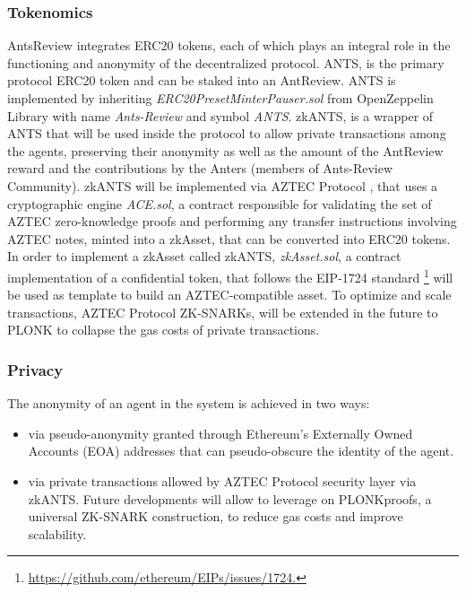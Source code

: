 \documentclass[runningheads]{llncs}
\begin{document}
\subsubsection{Tokenomics}
AntsReview integrates ERC20 tokens, each of which plays an integral role in the functioning and anonymity of the decentralized protocol.
\newline ANTS, is the primary protocol ERC20 token and can be staked into an AntReview.
\newline ANTS is implemented by inheriting \emph{ERC20PresetMinterPauser.sol} from OpenZeppelin Library with name \emph{Ants-Review} and symbol \emph{ANTS}.
\newline zkANTS, is a wrapper of ANTS that will be used inside the protocol to allow private transactions among the agents, preserving their anonymity as well as the amount of the AntReview reward and the contributions by the Anters (members of Ants-Review Community).
\newline zkANTS will be implemented via AZTEC Protocol \cite{AZTEC}, that uses a cryptographic engine \emph{ACE.sol}, a contract responsible for validating the set of AZTEC zero-knowledge proofs and performing any transfer instructions involving AZTEC notes, minted into a zkAsset, that can be converted into ERC20 tokens. In order to implement a zkAsset called zkANTS, \emph{zkAsset.sol}, a contract implementation of a confidential token, that follows the EIP-1724 standard \footnote[9]{\url{https://github.com/ethereum/EIPs/issues/1724.}} will be used as template to build an AZTEC-compatible asset.
\newline To optimize and scale transactions, AZTEC Protocol ZK-SNARKs, will be extended in the future to PLONK \cite{PLONK} to collapse the gas costs of private transactions.

\subsubsection{Privacy}
The anonymity of an agent in the system is achieved in two ways:

\begin{itemize}
  \item via pseudo-anonymity granted through Ethereum's Externally Owned Accounts (EOA) addresses that can pseudo-obscure the identity of the agent.
  \item via private transactions allowed by AZTEC Protocol security layer via zkANTS. Future developments will allow to leverage on PLONK\cite{PLONK}proofs, a universal ZK-SNARK construction, to reduce gas costs and improve scalability.
\end{itemize}
\end{document}
